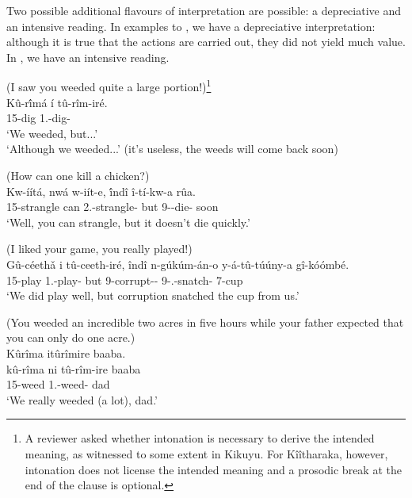 \documentclass[output=paper]{langscibook}
\begin{document}
\z


Two possible additional flavours of interpretation are possible: a depreciative and an intensive reading. In examples  to , we have a depreciative interpretation: although it is true that the actions are carried out, they did not yield much value. In , we have an intensive reading.

\ea
\label{bkm:Ref115858918}
(I saw you weeded quite a large portion!)\footnote{A reviewer asked whether intonation is necessary to derive the intended meaning, as witnessed to some extent in Kikuyu. For Kîîtharaka, however, intonation does not license the intended meaning and a prosodic break at the end of the clause is optional.}\\
\gll
Kû-r\'{î}má  í  tû-rîm-iré.\\
15-dig \FOC{} 1\PL.\SM{}-dig-\PFV{}\\
\glt
‘We weeded, but...’\\
‘Although we weeded...’ (it’s useless, the weeds will come back soon)

\z

\ea
(How can one kill a chicken?)\\
\gll
Kw-íítá,  nwá  w-iít-e,  \'{î}ndî  î-tí-kw-a  rûa.\\
15-strangle  can 2\SG.\SM{}-strangle-\SBJV{} but 9\SM{}-\NEG{}-die-\FV{} soon\\
\glt
  ‘Well, you can strangle, but it doesn’t die quickly.’

\z

\ea
\label{bkm:Ref115858998}
(I liked your game, you really played!)\\
\gll
Gû-céethǎ  i  tû-ceeth-iré,  îndî  n-gúkúm-án-o  y-á-tû-túúny-a  gî-kóómbé. \\
15-play \FOC{} 1\PL.\SM{}-play-\PFV{}   but  9-corrupt-\RECP-\NMLZ{} 9\SM-\PL.\OM{}-snatch-\FV{} 7-cup \\
\glt
  ‘We did play well, but corruption snatched the cup from us.’

\z

\ea
\label{bkm:Ref119738989}
(You weeded an incredible two acres in five hours while your father expected that you can only do one acre.)\\
Kûrîma itûrîmire baaba.\\
\gll
kû-rîma   ni  tû-rîm-ire   baaba\\
15-weed \FOC{}  1\PL.\SM{}-weed-\PFV{} dad\\
\glt
‘We really weeded (a lot), dad.’
\end{document}
